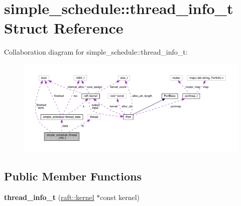 \hypertarget{structsimple__schedule_1_1thread__info__t}{}\section{simple\+\_\+schedule\+:\+:thread\+\_\+info\+\_\+t Struct Reference}
\label{structsimple__schedule_1_1thread__info__t}


Collaboration diagram for simple\+\_\+schedule\+:\+:thread\+\_\+info\+\_\+t\+:
\nopagebreak
\begin{figure}[H]
\begin{center}
\leavevmode
\includegraphics[width=350pt]{structsimple__schedule_1_1thread__info__t__coll__graph}
\end{center}
\end{figure}
\subsection*{Public Member Functions}
\begin{DoxyCompactItemize}
\item 
\hypertarget{structsimple__schedule_1_1thread__info__t_aa83297db67eb4c157e29e5f47e1dd8e9}{}\label{structsimple__schedule_1_1thread__info__t_aa83297db67eb4c157e29e5f47e1dd8e9} 
{\bfseries thread\+\_\+info\+\_\+t} (\hyperlink{classraft_1_1kernel}{raft\+::kernel} $\ast$const kernel)
\end{DoxyCompactItemize}
